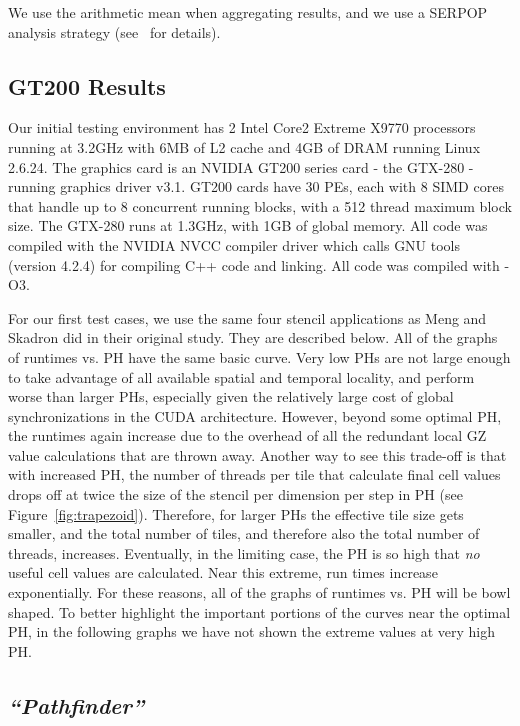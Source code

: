 \documentclass[preprint,nocopyrightspace]{styles/sigplanconf}
\begin{document}
We use the arithmetic mean when aggregating results, and we use a
SERPOP analysis strategy (see~\cite{Mashey} for details).

\subsection{GT200 Results}

Our initial testing environment has 2 Intel Core2 Extreme X9770 processors running at 3.2GHz with 6MB of L2 cache 
and 4GB of DRAM running Linux 2.6.24.  The graphics card is an NVIDIA GT200 series card - the GTX-280 - running 
graphics driver v3.1.  GT200 cards have 30 PEs, each with 8 SIMD cores that handle up to 8 
concurrent running blocks, with a 512 thread maximum block size.  The GTX-280 runs at 1.3GHz, with 1GB of
global memory.  All code was compiled with the NVIDIA NVCC compiler driver which 
calls GNU tools (version 4.2.4) for compiling C++ code and linking.  All code was compiled with -O3.

For our first test cases, we use the same four stencil applications as Meng and Skadron did in their original study.  
They are described below.
All of the graphs of runtimes vs. PH have the same basic curve.  Very low PHs are not
large enough to take advantage of all available spatial and temporal locality, and perform worse than larger
PHs, especially given the relatively large cost of global synchronizations in the CUDA architecture.  
However, beyond some optimal PH, the runtimes again increase due to the overhead
of all the redundant local GZ value calculations that are thrown away.
Another way to see this trade-off is that with increased PH, the number of threads per tile that calculate final cell 
values drops off at twice the size of the stencil per dimension per step in PH (see Figure~\ref{fig:trapezoid}).
Therefore, for larger PHs the effective tile size gets smaller, and the total number of tiles, and therefore
also the total number of threads, increases.  Eventually, in the limiting case, the PH is so high that 
{\em no} useful cell values are calculated.  Near this extreme, run times increase exponentially.  
For these reasons, all of the graphs of runtimes vs. PH will be bowl shaped.
To better highlight the important portions of the curves near the optimal PH,
in the following graphs we have not shown the extreme values at very high PH.

\subsection{\em ``Pathfinder''}
\end{document}
